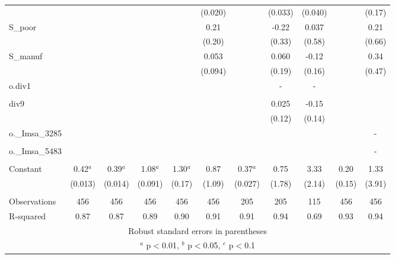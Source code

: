 \documentclass[]{article}
\begin{document}
\begin{tabular}{lcccccccccc}
 &  &  &  &  & (0.020) &  & (0.033) & (0.040) &  & (0.17) \\
S\_poor &  &  &  &  & 0.21 &  & -0.22 & 0.037 &  & 0.21 \\
 &  &  &  &  & (0.20) &  & (0.33) & (0.58) &  & (0.66) \\
S\_manuf &  &  &  &  & 0.053 &  & 0.060 & -0.12 &  & 0.34 \\
 &  &  &  &  & (0.094) &  & (0.19) & (0.16) &  & (0.47) \\
o.div1 &  &  &  &  &  &  & - & - &  &  \\
 &  &  &  &  &  &  &  &  &  &  \\
div9 &  &  &  &  &  &  & 0.025 & -0.15 &  &  \\
 &  &  &  &  &  &  & (0.12) & (0.14) &  &  \\
o.\_Imsa\_3285 &  &  &  &  &  &  &  &  &  & - \\
 &  &  &  &  &  &  &  &  &  &  \\
o.\_Imsa\_5483 &  &  &  &  &  &  &  &  &  & - \\
 &  &  &  &  &  &  &  &  &  &  \\
Constant & 0.42$^a$ & 0.39$^a$ & 1.08$^a$ & 1.30$^a$ & 0.87 & 0.37$^a$ & 0.75 & 3.33 & 0.20 & 1.33 \\
 & (0.013) & (0.014) & (0.091) & (0.17) & (1.09) & (0.027) & (1.78) & (2.14) & (0.15) & (3.91) \\
 &  &  &  &  &  &  &  &  &  &  \\
Observations & 456 & 456 & 456 & 456 & 456 & 205 & 205 & 115 & 456 & 456 \\
 R-squared & 0.87 & 0.87 & 0.89 & 0.90 & 0.91 & 0.91 & 0.94 & 0.69 & 0.93 & 0.94 \\ \hline
\multicolumn{11}{c}{ Robust standard errors in parentheses} \\
\multicolumn{11}{c}{ $^a$ p$<$0.01, $^b$ p$<$0.05, $^c$ p$<$0.1} \\
\end{tabular}
\end{document}
